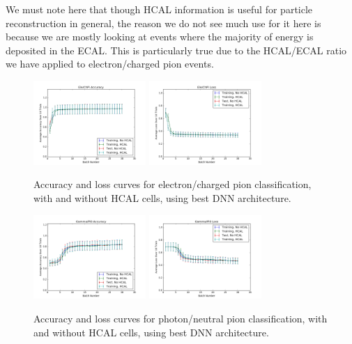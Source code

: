 We must note here that though HCAL information is useful for particle reconstruction in general, the reason we do not see much use for it here is because we are mostly looking at events where the majority of energy is deposited in the ECAL. This is particularly true due to the HCAL/ECAL ratio we have applied to electron/charged pion events.

\begin{figure}[htbp]
\centering
\includegraphics[width=0.38\textwidth]{Images/Calo/HCAL_study_elechpi_accuracy.png}
\includegraphics[width=0.38\textwidth]{Images/Calo/HCAL_study_elechpi_loss.png}
\caption{Accuracy and loss curves for electron/charged pion classification, with and without HCAL cells, using best DNN architecture.}
\label{fig:HCAL_study_elechpi}
\end{figure}

\begin{figure}[htbp]
\centering
\includegraphics[width=0.38\textwidth]{Images/Calo/HCAL_study_gammapi0_accuracy.png}
\includegraphics[width=0.38\textwidth]{Images/Calo/HCAL_study_gammapi0_loss.png}
\caption{Accuracy and loss curves for photon/neutral pion classification, with and without HCAL cells, using best DNN architecture.}
\label{fig:HCAL_study_gammapi0}
\end{figure}

